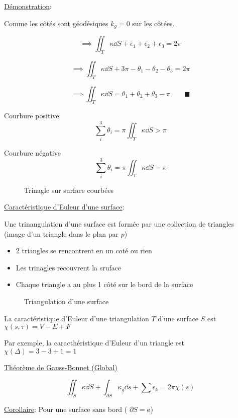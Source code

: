 \underline{Démonstration}:

Comme les côtés sont géodésiques $k_g = 0$ sur les côtées.

$$\implies \iint_T \kappa \dd S + \epsilon_1 +\epsilon_2 +\epsilon_3 = 2\pi$$ 

$$\implies \iint_T \kappa \dd S + 3\pi -\theta_1 -\theta_2 -\theta_3 = 2\pi$$

$$\implies \iint_T \kappa \dd S = \theta_1 + \theta_2 +\theta_3 - \pi \qquad \blacksquare$$ 

Courbure positive: $$\sum_i^3 \theta_i = \pi \iint_T \kappa \dd S > \pi$$ 

Courbure négative $$\sum_i^3 \theta_i = \pi \iint_T \kappa \dd S - \pi$$ 


\begin{figure}[ht]
    \centering
    \caption{Trinagle sur surface courbées}
    \label{fig:trinagle-sur-surface-courbées}
\end{figure}

\underline{Caractéristique d'Euleur d'une surface}:

Une trinangulation d'une surface est formée par une collection de triangles (image d'un triangle dans le plan par $p$)

\begin{itemize}
	\item 2 triangles se rencontrent en un coté ou rien
	\item Les trinagles recouvrent la sruface
	\item Chaque triangle a au plus 1 côté sur le bord de la surface
\end{itemize}

\begin{figure}[ht]
    \centering
    \caption{Triangulation d'une surface}
    \label{fig:triangulation}
\end{figure}

La caractéristique d'Euleur d'une triangulation $T$ d'une surface $S$ est $\chi(s,\tau) = V-E+F$

Par exemple, la caracthéristique d'Euleur d'un triangle est $\chi(\Delta) = 3-3+1 =1$ 

\underline{Théorème de Gauss-Bonnet (Global)}

$$\iint_S \kappa \dd S + \int_{\partial S} \kappa_g \dd s + \sum \epsilon_k = 2\pi \chi(s)$$ 

\underline{Corollaire}: Pour une surface sans bord ( $\partial S = $\o )  

